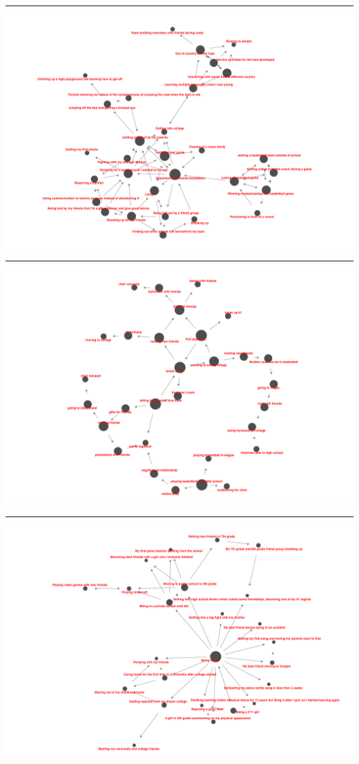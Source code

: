 \documentclass[
  .7em,
  letterpaper,
  DIV=11,
  numbers=noendperiod]{scrartcl}
\begin{document}
\begin{center}\rule{0.5\linewidth}{0.5pt}\end{center}

\includegraphics{images/61059_net.png}

\begin{center}\rule{0.5\linewidth}{0.5pt}\end{center}

\includegraphics{images/62097_net.png}

\begin{center}\rule{0.5\linewidth}{0.5pt}\end{center}

\includegraphics{images/62002_net.png}
\end{document}
